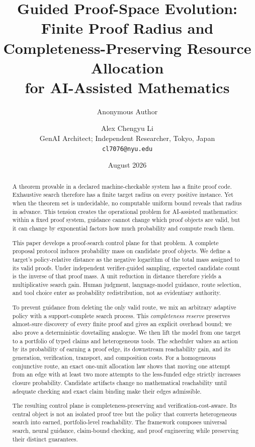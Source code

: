 \documentclass[11pt]{article}
\title{Guided Proof-Space Evolution:\\
Finite Proof Radius and Completeness-Preserving Resource Allocation\\
for AI-Assisted Mathematics}
\author{Anonymous Author}
\author{Alex Chengyu Li\\
  \small GenAI Architect; Independent Researcher, Tokyo, Japan\\
  \small \texttt{cl7076@nyu.edu}}
\date{August 2026}
\begin{document}
\maketitle

\begin{abstract}
A theorem provable in a declared machine-checkable system has a finite proof
code.  Exhaustive search therefore has a finite target radius on every positive
instance.  Yet when the theorem set is undecidable, no computable uniform bound
reveals that radius in advance.  This tension creates the operational problem
for AI-assisted mathematics: within a fixed proof system, guidance cannot
change which proof objects are valid, but it can change by exponential factors
how much probability and compute reach them.

This paper develops a proof-search control plane for that problem.  A complete
proposal protocol induces probability mass on candidate proof objects.  We
define a target's policy-relative distance as the negative logarithm of the
total mass assigned to its valid proofs.  Under independent verifier-guided
sampling, expected candidate count is the inverse of that proof mass.  A unit
reduction in distance therefore yields a multiplicative search gain.  Human
judgment, language-model guidance, route selection, and tool choice enter as
probability redistribution, not as evidentiary authority.

To prevent guidance from deleting the only valid route, we mix an arbitrary
adaptive policy with a support-complete search process.  This
\emph{completeness reserve} preserves almost-sure discovery of every finite
proof and gives an explicit overhead bound; we also prove a deterministic
dovetailing analogue.  We then lift the model from one target to a portfolio of
typed claims and heterogeneous tools.  The scheduler values an action by its
probability of earning a proof edge, its downstream reachability gain, and its
generation, verification, transport, and composition costs.  For a homogeneous
conjunctive route, an exact one-unit allocation law shows that moving one
attempt from an edge with at least two more attempts to the less-funded edge
strictly increases closure probability.  Candidate artifacts change no
mathematical reachability until adequate checking and exact claim binding make
their edges admissible.

The resulting control plane is completeness-preserving and
verification-cost-aware.  Its central object is not an isolated proof tree but
the policy that converts heterogeneous search into earned, portfolio-level
reachability.  The framework composes universal search, neural guidance,
claim-bound checking, and proof engineering while preserving their distinct
guarantees.
\end{abstract}
\end{document}
